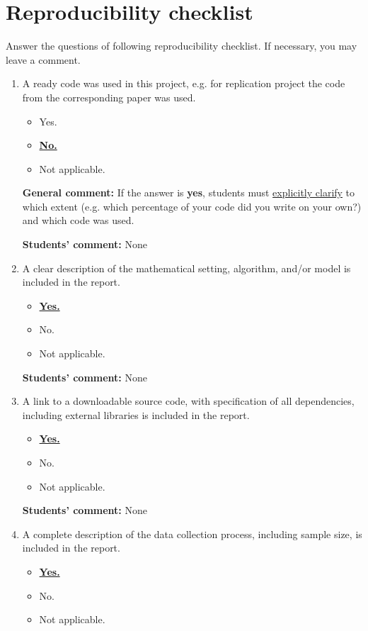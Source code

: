 \documentclass{article}
\begin{document}
\section{Reproducibility checklist}
\label{appendix-checklist}
Answer the questions of following reproducibility checklist. If necessary, you may leave a comment.
    \begin{enumerate}
    \item A ready code was used in this project, e.g. for replication project the code from the corresponding paper was used.
    \begin{itemize}
        \item [\faCheckSquareO] Yes.
        \item [\faSquareO] \textbf{\underline{No.}}
        \item [\faSquareO] Not applicable.
    \end{itemize}
    
    \textbf{General comment:} If the answer is \textbf{yes}, students must \underline{explicitly clarify} to which extent (e.g. which percentage of your code did you write on your own?) and which code was used.
    
    \textbf{Students' comment:} None
    \item A clear description of the mathematical setting, algorithm, and/or model is included in the report.
    \begin{itemize}
        \item [\faSquareO] \textbf{\underline{Yes.}}
        \item [\faSquareO] No.
        \item [\faSquareO] Not applicable.
    \end{itemize}
    
    \textbf{Students' comment:} None
    
    \item A link to a downloadable source code, with specification of all dependencies, including external libraries is included in the report.
    \begin{itemize}
        \item [\faSquareO] \textbf{\underline{Yes.}}
        \item [\faSquareO] No.
        \item [\faSquareO] Not applicable.
    \end{itemize}
    
    \textbf{Students' comment:} None
    
    \item A complete description of the data collection process, including sample size, is included in the report.
    \begin{itemize}
        \item [\faSquareO] \textbf{\underline{Yes.}}
        \item [\faSquareO] No.
        \item [\faSquareO] Not applicable.
    \end{itemize}
    

\end{enumerate}
\end{document}
